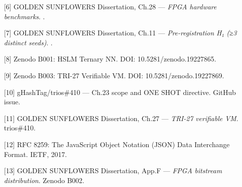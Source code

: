 [6] GOLDEN SUNFLOWERS Dissertation, Ch.28 ---
\emph{FPGA hardware benchmarks}.
.

[7] GOLDEN SUNFLOWERS Dissertation, Ch.11 ---
\emph{Pre-registration H₁ (≥3 distinct seeds)}.
.

[8] Zenodo B001: HSLM Ternary NN. DOI:
10.5281/zenodo.19227865.

[9] Zenodo B003: TRI-27 Verifiable VM. DOI:
10.5281/zenodo.19227869.

[10] gHashTag/trios\#410 --- Ch.23 scope and
ONE SHOT directive. GitHub issue.

[11] GOLDEN SUNFLOWERS Dissertation, Ch.27 ---
\emph{TRI-27 verifiable VM}. trios\#410.

[12] RFC 8259: The JavaScript Object Notation
(JSON) Data Interchange Format. IETF, 2017.

[13] GOLDEN SUNFLOWERS Dissertation, App.F ---
\emph{FPGA bitstream distribution}. Zenodo B002.

